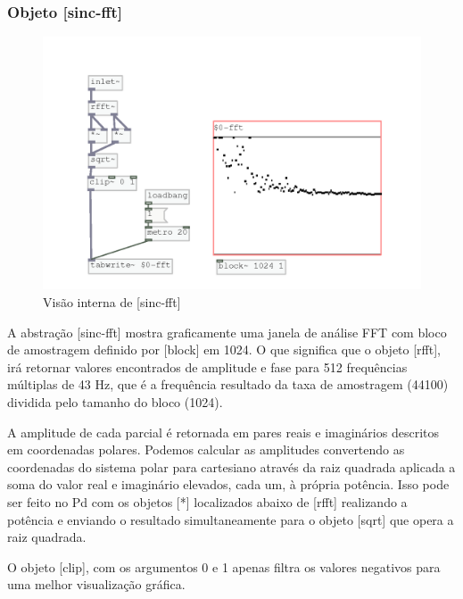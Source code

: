 \documentclass{ppgmus}
\begin{document}

\subsubsection{Objeto [sinc-fft]}


\begin{figure}
\includegraphics[scale=.55]{sinc-fft}
\caption{Visão interna de [sinc-fft]}
\label{sinc-fft}
\end{figure}



A abstração [sinc-fft] mostra graficamente uma janela de análise FFT com bloco de amostragem
definido por [block\texttildelow] em 1024. O que significa que o objeto [rfft\texttildelow],
irá retornar valores encontrados de amplitude e fase para 512 frequências múltiplas de 43 Hz,
que é a frequência resultado da taxa de amostragem (44100) dividida pelo tamanho do bloco (1024).

A amplitude de cada parcial é retornada em pares reais e imaginários descritos em coordenadas
polares. Podemos calcular as amplitudes convertendo as coordenadas do sistema polar para cartesiano 
através da raiz quadrada aplicada
a soma do valor real e imaginário elevados, cada um, à própria potência. Isso pode ser feito no Pd com os
objetos [*\texttildelow] localizados abaixo de [rfft\texttildelow] realizando a potência e enviando o resultado 
simultaneamente para o objeto [sqrt\texttildelow] que opera a raiz quadrada.

O objeto [clip\texttildelow], com os argumentos 0 e 1 apenas filtra os valores negativos para uma
melhor visualização gráfica.
\end{document}
